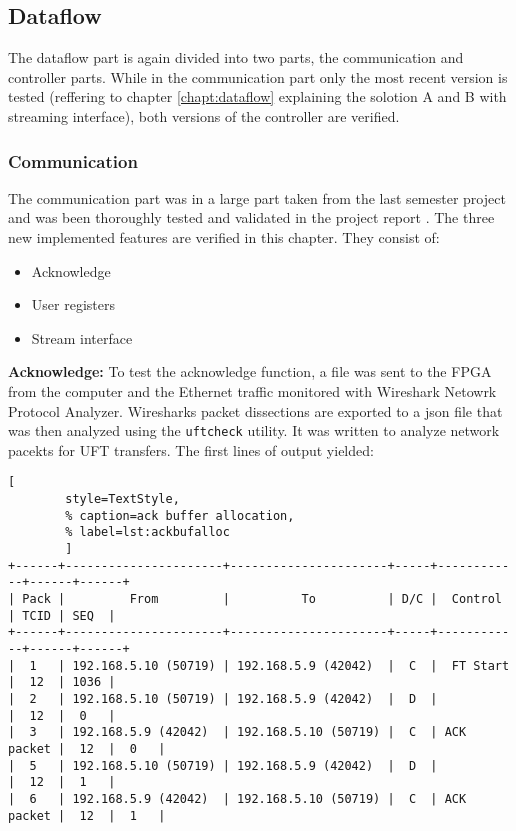 \subsection{Dataflow}\label{ch:verification:dataflow}
The dataflow part is again divided into two parts, the communication and
controller parts. While in the communication part only the most recent version
is tested (reffering to chapter \ref{chapt:dataflow} explaining the solotion
A and B with streaming interface), both versions of the controller are verified.

\subsubsection*{Communication}
The communication part was in a large part taken from the last semester project
and was been thoroughly tested and validated in the project report 
\cite{p5report}. The three new implemented features are verified in this
chapter. They consist of:
\begin{itemize}
    \item Acknowledge
    \item User registers
    \item Stream interface
\end{itemize}

\vspace{1ex}
\textbf{Acknowledge:} To test the acknowledge function, a file was sent to the
FPGA from the computer
and the Ethernet traffic monitored with Wireshark Netowrk Protocol Analyzer.
Wiresharks packet dissections are exported to a json file that was then analyzed
using the \texttt{uftcheck} utility. It was written to analyze network pacekts
for UFT transfers. The first lines of output yielded:

\vspace{1ex}
\begin{minipage}{1\linewidth}
    \begin{lstlisting}[
        style=TextStyle, 
        % caption=ack buffer allocation, 
        % label=lst:ackbufalloc
        ]
+------+----------------------+----------------------+-----+------------+------+------+
| Pack |         From         |          To          | D/C |  Control   | TCID | SEQ  | 
+------+----------------------+----------------------+-----+------------+------+------+
|  1   | 192.168.5.10 (50719) | 192.168.5.9 (42042)  |  C  |  FT Start  |  12  | 1036 |
|  2   | 192.168.5.10 (50719) | 192.168.5.9 (42042)  |  D  |            |  12  |  0   |
|  3   | 192.168.5.9 (42042)  | 192.168.5.10 (50719) |  C  | ACK packet |  12  |  0   |
|  5   | 192.168.5.10 (50719) | 192.168.5.9 (42042)  |  D  |            |  12  |  1   |
|  6   | 192.168.5.9 (42042)  | 192.168.5.10 (50719) |  C  | ACK packet |  12  |  1   |
\end{lstlisting}
\end{minipage}

